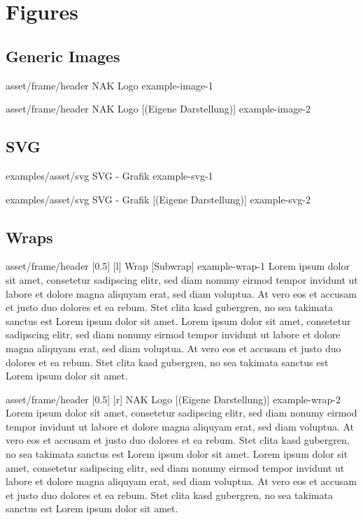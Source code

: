 \chapter{Figures}\label{ch:figures}

\section{Generic Images}\label{sec:figures-generic-images}
\image
{asset/frame/header}
{NAK Logo}
{example-image-1}

\image
{asset/frame/header}
{NAK Logo}
[(Eigene Darstellung)]
{example-image-2}

\section{SVG}\label{sec:figures-svg}
\svg
{examples/asset/svg}
{SVG - Grafik}
{example-svg-1}

\svg
{examples/asset/svg}
{SVG - Grafik}
[(Eigene Darstellung)]
{example-svg-2}

\section{Wraps}\label{sec:figurs-wrap}
\wrap
{asset/frame/header}
[0.5\linewidth]
[l] %
{Wrap}
[Subwrap] %
{example-wrap-1}
Lorem ipsum dolor sit amet, consetetur sadipscing elitr, sed diam nonumy eirmod tempor invidunt ut labore et dolore magna aliquyam erat, sed diam voluptua. At vero eos et accusam et justo duo dolores et ea rebum. Stet clita kasd gubergren, no sea takimata sanctus est Lorem ipsum dolor sit amet. Lorem ipsum dolor sit amet, consetetur sadipscing elitr, sed diam nonumy eirmod tempor invidunt ut labore et dolore magna aliquyam erat, sed diam voluptua. At vero eos et accusam et justo duo dolores et ea rebum. Stet clita kasd gubergren, no sea takimata sanctus est Lorem ipsum dolor sit amet.



\wrap
{asset/frame/header}
[0.5\linewidth]
[r] %
{NAK Logo}
[(Eigene Darstellung)]
{example-wrap-2}
Lorem ipsum dolor sit amet, consetetur sadipscing elitr, sed diam nonumy eirmod tempor invidunt ut labore et dolore magna aliquyam erat, sed diam voluptua. At vero eos et accusam et justo duo dolores et ea rebum. Stet clita kasd gubergren, no sea takimata sanctus est Lorem ipsum dolor sit amet. Lorem ipsum dolor sit amet, consetetur sadipscing elitr, sed diam nonumy eirmod tempor invidunt ut labore et dolore magna aliquyam erat, sed diam voluptua. At vero eos et accusam et justo duo dolores et ea rebum. Stet clita kasd gubergren, no sea takimata sanctus est Lorem ipsum dolor sit amet.